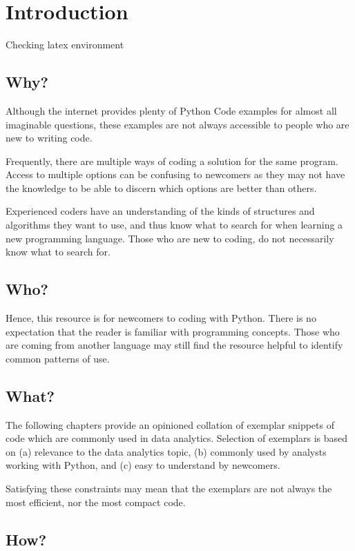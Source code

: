 \chapter{Introduction}
\label{chapter:introduction}

Checking latex environment
\section{Why?}

Although the internet provides plenty of Python Code examples for almost all imaginable questions, these examples are not always accessible to people who are new to writing code.

Frequently, there are multiple ways of coding a solution for the same program. Access to multiple options can be confusing to newcomers as they may not have the knowledge to be able to discern which options are better than others.

Experienced coders have an understanding of the kinds of structures and algorithms they want to use, and thus know what to search for when learning a new programming language. Those who are new to coding, do not necessarily know what to search for.

\section{Who?}

Hence, this resource is for newcomers to coding with Python. There is no expectation that the reader is familiar with programming concepts. Those who are coming from another language may still find the resource helpful to identify common patterns of use.

\section{What?}

The following chapters provide an opinioned collation of exemplar snippets of code which are commonly used in data analytics. Selection of exemplars is based on (a) relevance to the data analytics topic, (b) commonly used by analysts working with Python, and (c) easy to understand by newcomers.

Satisfying these constraints may mean that the exemplars are not always the most efficient, nor the most compact code.

\section{How?}

